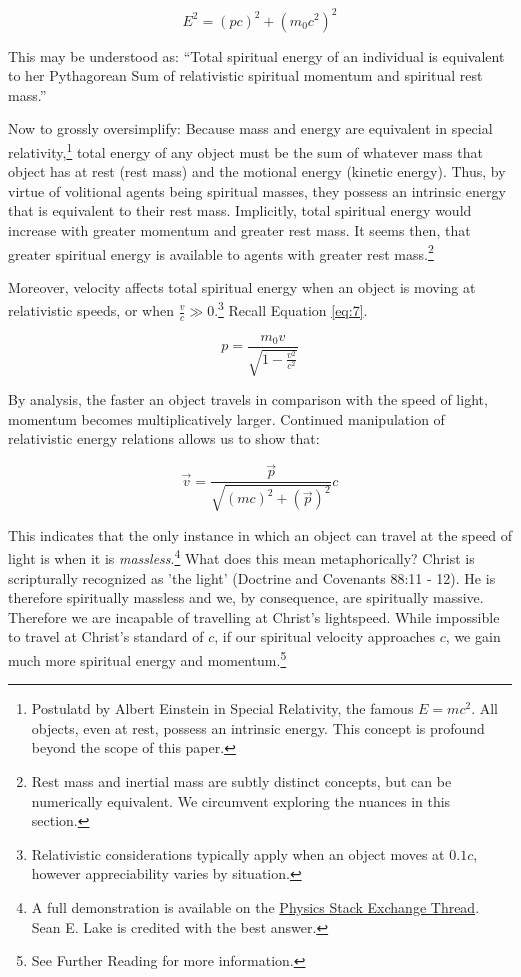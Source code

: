 \documentclass{article}
\begin{document}
                \[E^2 = (pc)^2 + (m_0c^2)^2\]

                This may be understood as: ``Total spiritual energy of an individual is equivalent to her Pythagorean Sum of relativistic spiritual momentum and spiritual rest mass.''
                 
                Now to grossly oversimplify: Because mass and energy are equivalent in special relativity,\footnote{Postulatd by Albert Einstein in Special Relativity, the famous $E = mc^2$. All objects, even at rest, possess an intrinsic energy. This concept is profound beyond the scope of this paper.} 
                total energy of any object must be the sum of whatever mass that object has at rest (rest mass) and the motional energy (kinetic energy).
                Thus, by virtue of volitional agents being spiritual masses, they possess an intrinsic energy that is equivalent to their rest mass. 
                Implicitly, total spiritual energy would increase with greater momentum and greater rest mass. It seems then, that greater spiritual energy is available to agents with greater rest mass.\footnote{Rest mass and inertial mass are subtly distinct concepts, but can be numerically equivalent. We circumvent exploring the nuances in this section.}

                Moreover, velocity affects total spiritual energy when an object is moving at relativistic speeds, or when $\tfrac{v}{c} \gg 0$.\footnote{Relativistic considerations typically apply when an object moves at $0.1c$, however appreciability varies by situation.}
                Recall Equation \ref{eq:7}. 

                \[p = \dfrac{m_0v}{\sqrt{1 - \frac{v^2}{c^2}}}\]

                By analysis, the faster an object travels in comparison with the speed of light, momentum becomes multiplicatively larger. 
                Continued manipulation of relativistic energy relations allows us to show that:

                \begin{equation}\label{eq:9}
                    \vec{v} = \dfrac{\vec{p}}{\sqrt{(mc)^2 + (\vec{p})^2}}c
                \end{equation}

                This indicates that the only instance in which an object can travel at the speed of light is when it is \emph{massless}.\footnote{A full demonstration is available on the \href{https://physics.stackexchange.com/questions/289034/reason-why-only-massless-particles-can-travel-at-speed-of-light}{Physics Stack Exchange Thread}. Sean E. Lake is credited with the best answer.}
                What does this mean metaphorically? Christ is scripturally recognized as 'the light' (Doctrine and Covenants 88:11 - 12). He is therefore spiritually massless and we, by consequence, are spiritually massive.
                Therefore we are incapable of travelling at Christ's lightspeed. 
                While impossible to travel at Christ's standard of $c$, if our spiritual velocity approaches $c$, we gain much more spiritual energy and momentum.\footnote{See Further Reading for more information.}
\end{document}
